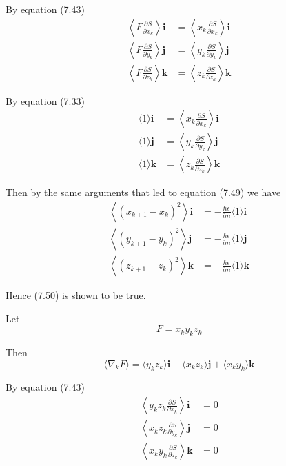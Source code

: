 \documentclass[12pt]{article}
\begin{document}
By equation (7.43)
\begin{align*}
\left\langle F\frac{\partial S}{\partial x_k}\right\rangle\mathbf i
&=\left\langle x_k\frac{\partial S}{\partial x_k}\right\rangle\mathbf i
\\
\left\langle F\frac{\partial S}{\partial y_k}\right\rangle\mathbf j
&=\left\langle y_k\frac{\partial S}{\partial y_k}\right\rangle\mathbf j
\\
\left\langle F\frac{\partial S}{\partial z_k}\right\rangle\mathbf k
&=\left\langle z_k\frac{\partial S}{\partial z_k}\right\rangle\mathbf k
\end{align*}

By equation (7.33)
\begin{align*}
\langle1\rangle\mathbf i&=\left\langle x_k\frac{\partial S}{\partial x_k}\right\rangle\mathbf i
\\
\langle1\rangle\mathbf j&=\left\langle y_k\frac{\partial S}{\partial y_k}\right\rangle\mathbf j
\\
\langle1\rangle\mathbf k&=\left\langle z_k\frac{\partial S}{\partial z_k}\right\rangle\mathbf k
\end{align*}

Then by the same arguments that led to equation (7.49) we have
\begin{align*}
\left\langle(x_{k+1}-x_k)^2\right\rangle\mathbf i&=-\frac{\hbar\epsilon}{im}\langle1\rangle\mathbf i
\\
\left\langle(y_{k+1}-y_k)^2\right\rangle\mathbf j&=-\frac{\hbar\epsilon}{im}\langle1\rangle\mathbf j
\\
\left\langle(z_{k+1}-z_k)^2\right\rangle\mathbf k&=-\frac{\hbar\epsilon}{im}\langle1\rangle\mathbf k
\end{align*}

Hence (7.50) is shown to be true.

\bigskip
Let
\begin{equation*}
F=x_ky_kz_k
\end{equation*}

Then
\begin{equation*}
\langle\nabla_kF\rangle
=\langle y_kz_k\rangle\mathbf i
+\langle x_kz_k\rangle\mathbf j
+\langle x_ky_k\rangle\mathbf k
\end{equation*}

By equation (7.43)
\begin{align*}
\left\langle y_kz_k\frac{\partial S}{\partial x_k}\right\rangle\mathbf i&=0
\\
\left\langle x_kz_k\frac{\partial S}{\partial y_k}\right\rangle\mathbf j&=0
\\
\left\langle x_ky_k\frac{\partial S}{\partial z_k}\right\rangle\mathbf k&=0
\end{align*}
\end{document}
